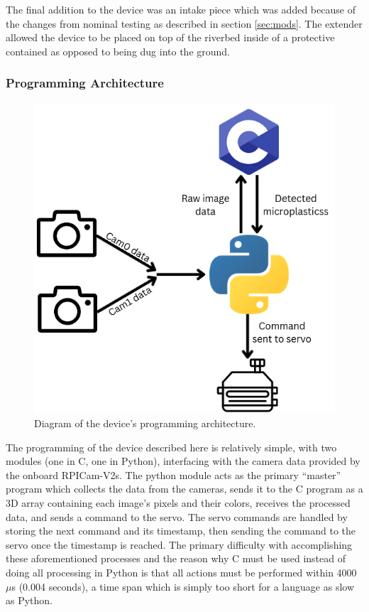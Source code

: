\documentclass[fleqn,10pt]{SelfArx} %
\begin{document}
	
	The final addition to the device was an intake piece which was added because of the changes from nominal testing as described in section \ref{sec:mods}. The extender allowed the device to be placed on top of the riverbed inside of a protective contained as opposed to being dug into the ground. 
	
	
	
	\subsubsection{Programming Architecture}\label{sec:programmingArch}
	\begin{figure}[h]
		\centering
		\includegraphics[width=1\linewidth]{Figures/ProgrammingArch}
		\caption[Programming Architecture Diagram]{Diagram of the device's programming architecture.}
		\label{fig:ProgArch}
	\end{figure} 
	The programming of the device described here is relatively simple, with two modules (one in C, one in Python), interfacing with the camera data provided by the onboard \gls{RPI}Cam-V2s. The python module acts as the primary “master” program which collects the data from the cameras, sends it to the C program as a 3D array containing each image’s pixels and their colors, receives the processed data, and sends a command to the servo. The servo commands are handled by storing the next command and its timestamp, then sending the command to the servo once the timestamp is reached. The primary difficulty with accomplishing these aforementioned processes and the reason why C must be used instead of doing all processing in Python is that all actions must be performed within 4000 $\mu$s (0.004 seconds), a time span which is simply too short for a language as slow as Python. 
	
\end{document}
